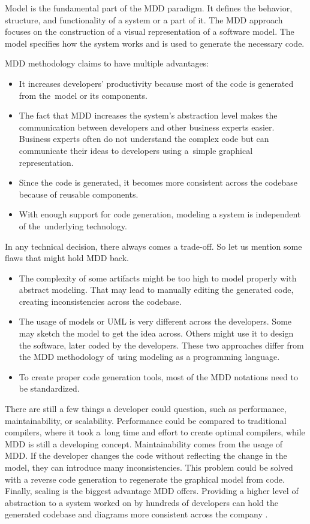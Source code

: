 Model is the fundamental part of the MDD paradigm. It defines the behavior, structure, and functionality of a system or a part of it. The MDD approach focuses on the construction of a visual representation of a software model. The model specifies how the system works and is used to generate the necessary code.

MDD methodology claims to have multiple advantages:

\begin{itemize}
    \item It increases developers' productivity because most of the code is generated from the~model or its components.
    \item The fact that MDD increases the system's abstraction level makes the communication between developers and other business experts easier. Business experts often do not understand the complex code but can communicate their ideas to developers using a~simple graphical representation.
    \item Since the code is generated, it becomes more consistent across the codebase because of reusable components.
    \item With enough support for code generation, modeling a system is independent of the~underlying technology.
\end{itemize}


In any technical decision, there always comes a trade-off. So let us mention some flaws that might hold MDD back.

\begin{itemize}
\item The complexity of some artifacts might be too high to model properly with abstract modeling. That may lead to manually editing the generated code, creating inconsistencies across the codebase.
\item The usage of models or UML is very different across the developers. Some may sketch the model to get the idea across. Others might use it to design the software, later coded by the developers. These two approaches differ from the MDD methodology of~using modeling as a programming language.

\item To create proper code generation tools, most of the MDD notations need to be standardized.
\end{itemize}
There are still a few things a developer could question, such as performance, maintainability, or scalability. Performance could be compared to traditional compilers, where it took a~long time and effort to create optimal compilers, while MDD is still a developing concept. Maintainability comes from the usage of MDD. If the developer changes the code without reflecting the change in the model, they can introduce many inconsistencies. This problem could be solved with a reverse code generation to regenerate the graphical model from code.
Finally, scaling is the biggest advantage MDD offers. Providing a higher level of abstraction to a system worked on by hundreds of developers can hold the generated codebase and diagrams more consistent across the company \cite{pragma-mdd}.



